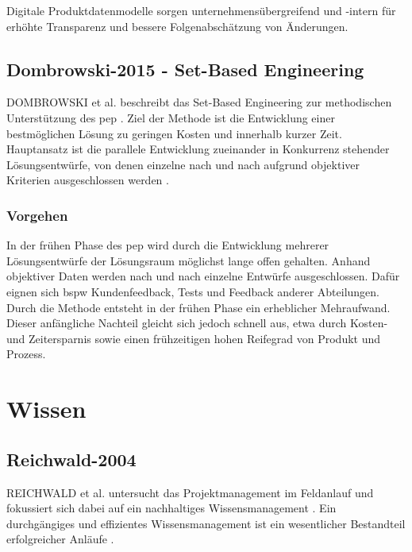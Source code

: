 Digitale Produktdatenmodelle sorgen unternehmensübergreifend und -intern für erhöhte Transparenz und bessere Folgenabschätzung von Änderungen. 


\subsection*{Dombrowski-2015 - Set-Based Engineering}

DOMBROWSKI et al. beschreibt das Set-Based Engineering zur methodischen Unterstützung des \gls{pep} \cite{Dombrowski2015}. %
Ziel der Methode ist die Entwicklung einer bestmöglichen Lösung zu geringen Kosten und innerhalb kurzer Zeit. 
Hauptansatz ist die parallele Entwicklung zueinander in Konkurrenz stehender Lösungsentwürfe, von denen einzelne nach und nach aufgrund objektiver Kriterien ausgeschlossen werden \cite{Schuh2007}.

\subsubsection*{Vorgehen}
In der frühen Phase des \gls{pep} wird durch die Entwicklung mehrerer Lösungsentwürfe der Lösungsraum möglichst lange offen gehalten. Anhand objektiver Daten werden nach und nach einzelne Entwürfe ausgeschlossen. Dafür eignen sich \gls{bspw} Kundenfeedback, Tests und Feedback anderer Abteilungen. 
Durch die Methode entsteht in der frühen Phase ein erheblicher Mehraufwand. Dieser anfängliche Nachteil gleicht sich jedoch schnell aus, etwa durch Kosten- und Zeitersparnis sowie einen frühzeitigen hohen Reifegrad von Produkt und Prozess. 

\section{Wissen}
\subsection*{Reichwald-2004}
REICHWALD et al. untersucht das Projektmanagement im Feldanlauf und fokussiert sich dabei auf ein nachhaltiges Wissensmanagement \cite{Reichwald2004}. Ein durchgängiges und effizientes Wissensmanagement ist ein wesentlicher Bestandteil erfolgreicher Anläufe \cite{Kuhn2002}. 

